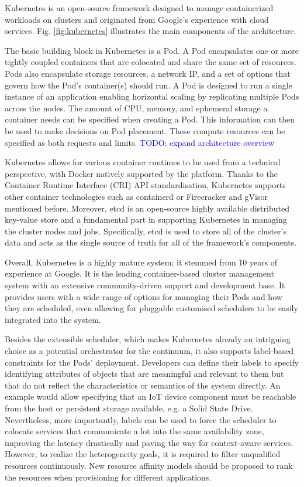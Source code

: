 Kubernetes \cite{kubernetes} is an open-source framework designed to manage containerized workloads on clusters and originated from Google's experience with cloud services. Fig. \ref{fig:kubernetes} illustrates the main components of the architecture.

The basic building block in Kubernetes is a Pod. A Pod encapsulates one or more tightly coupled containers that are colocated and share the same set of resources. Pods also encapsulate storage resources, a network IP, and a set of options that govern how the Pod's container(s) should run. A Pod is designed to run a single instance of an application enabling horizontal scaling by replicating multiple Pods across the nodes. The amount of CPU, memory, and ephemeral storage a container needs can be specified when creating a Pod. This information can then be used to make decisions on Pod placement. These compute resources can be specified as both requests and limits. \textcolor{blue}{TODO: expand architecture overview}

Kubernetes allows for various container runtimes to be used from a technical perspective, with Docker natively supported by the platform. Thanks to the Container Runtime Interface (CRI) API standardisation, Kubernetes supports other container technologies such as containerd \cite{containerd} or Firecracker and gVisor mentioned before. Moreover, etcd \cite{etcd} is an open-source highly available distributed key-value store and a fundamental part in supporting Kubernetes in managing the cluster nodes and jobs. Specifically, etcd is used to store all of the cluster's data and acts as the single source of truth for all of the framework's components.

Overall, Kubernetes is a highly mature system; it stemmed from 10 years of experience at Google. It is the leading container-based cluster management system with an extensive community-driven support and development base. It provides users with a wide range of options for managing their Pods and how they are scheduled, even allowing for pluggable customised schedulers to be easily integrated into the system.

Besides the extensible scheduler, which makes Kubernetes already an intriguing choice as a potential orchestrator for the continuum, it also supports label-based constraints for the Pods' deployment. Developers can define their labels to specify identifying attributes of objects that are meaningful and relevant to them but that do not reflect the characteristics or semantics of the system directly. An example would allow specifying that an IoT device component must be reachable from the host or persistent storage available, e.g. a Solid State Drive. Nevertheless, more importantly, labels can be used to force the scheduler to colocate services that communicate a lot into the same availability zone, improving the latency drastically and paving the way for context-aware services. However, to realize the heterogeneity goals, it is required to filter unqualified resources continuously. New resource affinity models should be proposed to rank the resources when provisioning for different applications. 


